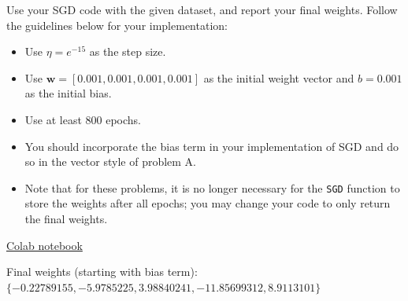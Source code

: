 \begin{problem}[6]
  Use your SGD code with the given dataset, and report your final weights. Follow the guidelines below for your implementation:

  \begin{itemize}
    \item Use $\eta = e^{-15}$ as the step size.  
    \item Use $\mathbf{w} = [0.001, 0.001, 0.001, 0.001]$ as the initial weight vector and $b = 0.001$ as the initial bias.
    \item Use at least 800 epochs.
    \item You should incorporate the bias term in your implementation of SGD and do so in the vector style of problem A.
    \item Note that for these problems, it is no longer necessary for the \texttt{SGD} function to store the weights after all epochs; you may change your code to only return the final weights.
  \end{itemize}
\end{problem}
\begin{solution}
  \href{https://colab.research.google.com/drive/13kZ33A5NlrEs93pWJxwIInLGBYfpKu4Y?usp=sharing}{Colab notebook}

  Final weights (starting with bias term): $\{-0.22789155, -5.9785225, 3.98840241, -11.85699312, 8.9113101\}$
\end{solution}

